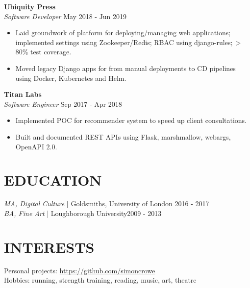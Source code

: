 \documentclass[line,margin]{res}
\begin{document}
\begin{resume}
                \textbf{Ubiquity Press} \\
                {\sl Software Developer} \hfill        May 2018 - Jun 2019 \\
                  \begin{itemize} \itemsep -0pt %
                  \item Laid groundwork of platform for deploying/managing web applications;
                        implemented settings using Zookeeper/Redis; RBAC using django-rules$; > $80\% test coverage.
                  \item Moved legacy Django apps for from manual deployments to CD pipelines \\
                        using Docker, Kubernetes and Helm.
                  \end{itemize}

	        \textbf{Titan Labs} \\
                {\sl Software Engineer} \hfill         Sep 2017 - Apr 2018 \\
                  \begin{itemize} \itemsep -0pt %
                  \item Implemented POC for recommender system to speed up client consultations.
                  \item Built and documented REST APIs using Flask, marshmallow, webargs, OpenAPI 2.0.
                  \end{itemize}


\section{EDUCATION} {\sl MA, Digital Culture} | Goldsmiths, University of London \hfill 2016 - 2017 \\
                    {\sl BA, Fine Art} | Loughborough University\hfill 2009 - 2013


\section{INTERESTS} Personal projects: \url{https://github.com/simoncrowe} \\
                    Hobbies: running, strength training, reading, music, art, theatre


\end{resume}
\end{document}

